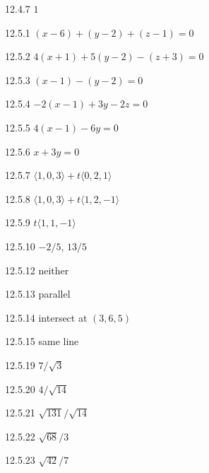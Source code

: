 \begin{Answer}{12.4.7}
	$1$
\end{Answer}
\begin{Answer}{12.5.1}
	$(x-6)+(y-2)+(z-1)=0$
\end{Answer}
\begin{Answer}{12.5.2}
	$4(x+1)+5(y-2)-(z+3)=0$
\end{Answer}
\begin{Answer}{12.5.3}
	$(x-1)-(y-2)=0$
\end{Answer}
\begin{Answer}{12.5.4}
	$-2(x-1)+3y-2z=0$
\end{Answer}
\begin{Answer}{12.5.5}
	$4(x-1)-6y = 0$
\end{Answer}
\begin{Answer}{12.5.6}
	$x+3y=0$
\end{Answer}
\begin{Answer}{12.5.7}
	$\langle 1,0,3\rangle+t\langle 0,2,1\rangle$
\end{Answer}
\begin{Answer}{12.5.8}
	$\langle 1,0,3\rangle+t\langle 1,2,-1\rangle$
\end{Answer}
\begin{Answer}{12.5.9}
	$t\langle 1,1,-1\rangle$
\end{Answer}
\begin{Answer}{12.5.10}
	$-2/5$, $13/5$
\end{Answer}
\begin{Answer}{12.5.12}
	neither
\end{Answer}
\begin{Answer}{12.5.13}
	parallel
\end{Answer}
\begin{Answer}{12.5.14}
	intersect at $(3,6,5)$
\end{Answer}
\begin{Answer}{12.5.15}
	same line
\end{Answer}
\begin{Answer}{12.5.19}
	$7/\sqrt3$
\end{Answer}
\begin{Answer}{12.5.20}
	$4/\sqrt{14}$
\end{Answer}
\begin{Answer}{12.5.21}
	$\sqrt{131}/\sqrt{14}$
\end{Answer}
\begin{Answer}{12.5.22}
	$\sqrt{68}/3$
\end{Answer}
\begin{Answer}{12.5.23}
	$\sqrt{42}/7$
\end{Answer}
